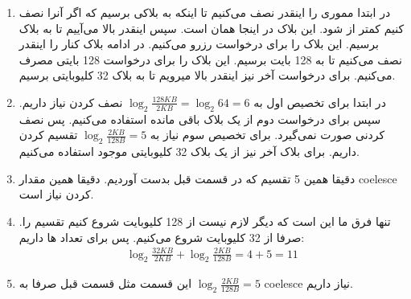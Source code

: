 \begin{enumerate}
    \item در ابتدا مموری را اینقدر نصف می‌کنیم تا اینکه به بلاکی برسیم که اگر آنرا نصف کنیم کمتر از
    شود. این بلاک در اینجا همان
    است. سپس اینقدر بالا می‌آییم تا به بلاک
    برسیم. این بلاک را برای درخواست
    رزرو می‌کنیم.
    در ادامه بلاک کنار
    را اینقدر نصف می‌کنیم تا به 128 بایت برسیم. این بلاک را برای درخواست
    128 بایتی مصرف می‌کنیم.
    برای درخواست آخر نیز اینقدر بالا میرویم تا به بلاک
    32 کلیوبایتی برسیم.
    \item در ابتدا برای تخصیص اول به $\log_2{\frac{128 KB}{2 KB}} = \log_2{64} = 6$
    نصف کردن نیاز داریم.
    سپس برای درخواست دوم از
    یک بلاک
    باقی مانده استفاده می‌کنیم. پس نصف کردنی صورت نمی‌گیرد.
    برای تخصیص سوم نیاز به
    $\log_2{\frac{2 KB}{128 B}} = 5$
    تقسیم کردن داریم. برای بلاک آخر نیز از یک بلاک 32 کلیوبایتی موجود استفاده می‌کنیم.
    \item دقیقا همین 5 تقسیم که در قسمت قبل بدست آوردیم. دقیقا همین مقدار coelesce کردن نیاز است.
    \item تنها فرق ما این است که دیگر لازم نیست از 128 کلیوبایت شروع کنیم تقسیم را. صرفا از 32 کلیوبایت شروع می‌کنیم.
    پس برای تعداد ها
    داریم:
    \begin{gather*}
        \log_2{\frac{32 KB}{2 KB}} + \log_2{\frac{2 KB}{128 B}} = 4 + 5 = 11
    \end{gather*}
    \item این قسمت مثل قسمت قبل صرفا به
    $\log_2{\frac{2 KB}{128 B}} = 5$
    coelesce نیاز داریم.
\end{enumerate}


